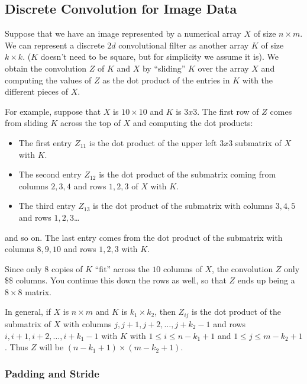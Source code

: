 \documentclass[
  11pt,
  letterpaper,
]{scrbook}
\providecommand{\tightlist}{%
  \setlength{\itemsep}{0pt}\setlength{\parskip}{0pt}}\usepackage{longtable,booktabs,array}
\theoremstyle{plain}
\theoremstyle{remark}
\begin{document}
\hypertarget{discrete-convolution-for-image-data}{%
\subsection{Discrete Convolution for Image
Data}\label{discrete-convolution-for-image-data}}

Suppose that we have an image represented by a numerical array \(X\) of
size \(n\times m\). We can represent a discrete \(2d\) convolutional
filter as another array \(K\) of size \(k\times k\). (\(K\) doesn't need
to be square, but for simplicity we assume it is). We obtain the
convolution \(Z\) of \(K\) and \(X\) by ``sliding'' \(K\) over the array
\(X\) and computing the values of \(Z\) as the dot product of the
entries in \(K\) with the different pieces of \(X\).

For example, suppose that \(X\) is \(10\times 10\) and \(K\) is \(3x3\).
The first row of \(Z\) comes from sliding \(K\) across the top of \(X\)
and computing the dot products:

\begin{itemize}
\tightlist
\item
  The first entry \(Z_{11}\) is the dot product of the upper left
  \(3x3\) submatrix of \(X\) with \(K\).\\
\item
  The second entry \(Z_{12}\) is the dot product of the submatrix coming
  from columns \(2,3,4\) and rows \(1,2,3\) of \(X\) with \(K\).
\item
  The third entry \(Z_{13}\) is the dot product of the submatrix with
  columns \(3,4,5\) and rows \(1,2,3\)\ldots{}
\end{itemize}

and so on. The last entry comes from the dot product of the submatrix
with columns \(8,9,10\) and rows \(1,2,3\) with \(K\).

Since only \(8\) copies of \(K\) ``fit'' across the \(10\) columns of
\(X\), the convolution \(Z\) only \$\$ columns. You continue this down
the rows as well, so that \(Z\) ends up being a \(8\times 8\) matrix.

In general, if \(X\) is \(n\times m\) and \(K\) is \(k_1\times k_2\),
then \(Z_{ij}\) is the dot product of the submatrix of \(X\) with
columns \(j,j+1,j+2,\ldots, j+k_2-1\) and rows
\(i, i+1, i+2, \ldots, i+k_1-1\) with \(K\) with \(1\le i\le n-k_1+1\)
and \(1\le j\le m-k_2+1\). Thus \(Z\) will be
\((n-k_1+1)\times (m-k_2+1)\).

\hypertarget{padding-and-stride}{%
\subsubsection{Padding and Stride}\label{padding-and-stride}}
\end{document}
